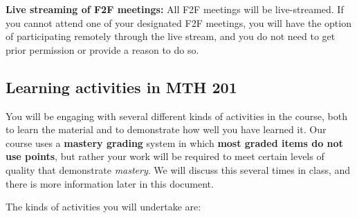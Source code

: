 \documentclass[]{article}
\begin{document}
\textbf{Live streaming of F2F meetings:} All F2F meetings will be
live-streamed. If you cannot attend one of your designated F2F meetings,
you will have the option of participating remotely through the live
stream, and you do not need to get prior permission or provide a reason
to do so.

\hypertarget{learning-activities-in-mth-201}{%
\subsection{Learning activities in MTH
201}\label{learning-activities-in-mth-201}}

You will be engaging with several different kinds of activities in the
course, both to learn the material and to demonstrate how well you have
learned it. Our course uses a \textbf{mastery grading} system in which
\textbf{most graded items do not use points}, but rather your work will
be required to meet certain levels of quality that demonstrate
\emph{mastery}. We will discuss this several times in class, and there
is more information later in this document.

The kinds of activities you will undertake are:
\end{document}
